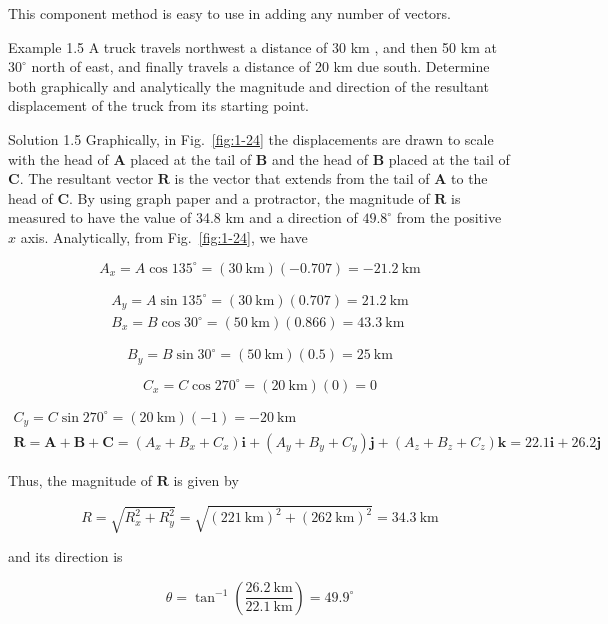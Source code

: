 \documentclass[10pt]{article}
\numberwithin{equation}{section}
\begin{document}
This component method is easy to use in adding any number of vectors.

Example 1.5 A truck travels northwest a distance of 30 km , and then 50 km at $30^{\circ}$ north of east, and finally travels a distance of 20 km due south. Determine both graphically and analytically the magnitude and direction of the resultant displacement of the truck from its starting point.

Solution 1.5 Graphically, in Fig.~\ref{fig:1-24} the displacements are drawn to scale with the head of $\mathbf{A}$ placed at the tail of $\mathbf{B}$ and the head of $\mathbf{B}$ placed at the tail of $\mathbf{C}$. The resultant vector $\mathbf{R}$ is the vector that extends from the tail of $\mathbf{A}$ to the head of $\mathbf{C}$. By using graph paper and a protractor, the magnitude of $\mathbf{R}$ is measured to have the value of 34.8 km and a direction of $49.8^{\circ}$ from the positive $x$ axis. Analytically, from Fig.~\ref{fig:1-24}, we have

$$
A_{x}=A \cos 135^{\circ}=(30 \mathrm{~km})(-0.707)=-21.2 \mathrm{~km}
$$

$$
\begin{gathered}
A_{y}=A \sin 135^{\circ}=(30 \mathrm{~km})(0.707)=21.2 \mathrm{~km} \\
B_{x}=B \cos 30^{\circ}=(50 \mathrm{~km})(0.866)=43.3 \mathrm{~km}
\end{gathered}
$$

$$
B_{y}=B \sin 30^{\circ}=(50 \mathrm{~km})(0.5)=25 \mathrm{~km}
$$

$$
C_{x}=C \cos 270^{\circ}=(20 \mathrm{~km})(0)=0
$$

$$
\begin{gathered}
C_{y}=C \sin 270^{\circ}=(20 \mathrm{~km})(-1)=-20 \mathrm{~km} \\
\mathbf{R}=\mathbf{A}+\mathbf{B}+\mathbf{C}=\left(A_{x}+B_{x}+C_{x}\right) \mathbf{i}+\left(A_{y}+B_{y}+C_{y}\right) \mathbf{j}+\left(A_{z}+B_{z}+C_{z}\right) \mathbf{k}=22.1 \mathbf{i}+26.2 \mathbf{j}
\end{gathered}
$$

Thus, the magnitude of $\mathbf{R}$ is given by

$$
R=\sqrt{R_{x}^{2}+R_{y}^{2}}=\sqrt{(221 \mathrm{~km})^{2}+(262 \mathrm{~km})^{2}}=34.3 \mathrm{~km}
$$

and its direction is

$$
\theta=\tan ^{-1}\left(\frac{26.2 \mathrm{~km}}{22.1 \mathrm{~km}}\right)=49.9^{\circ}
$$
\end{document}
